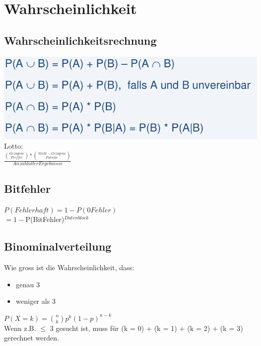 
\section{Wahrscheinlichkeit}

\subsection{Wahrscheinlichkeitsrechnung}
\includegraphics[width=\linewidth]{graphic/extern-reto/Wahrscheinlichkeit.png}
Lotto:\\
\colorbox{lightlightgrey}{$\frac{\binom{Gezogene}{Treffer} * \binom{Nicht-Gezogene}{Falsche}}{Anzahl aller Ergebnisse}$}\\



\subsection{Bitfehler}
\colorbox{lightlightgrey}{$P(Fehlerhaft) = 1 - P(0 Fehler)$}\\
$= 1 - $P(BitFehler)$^{Datenblock}$



\subsection{Binominalverteilung}
Wie gross ist die Wahrscheinlichkeit, dass:
\begin{itemize}
    \item genau 3
    \item weniger als 3
\end{itemize}
\colorbox{lightlightgrey}{$P(X = k) = \binom{n}{k} p^k(1 - p)^{n-k}$}\\
Wenn z.B. $\le$ 3 gesucht ist, muss für (k = 0) + (k = 1) + (k = 2) + (k = 3) gerechnet werden.

